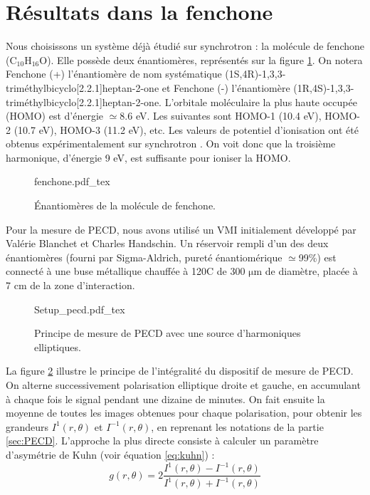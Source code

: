 \section{Résultats dans la fenchone}
\label{sec:results_fenchone}
Nous choisissons un système déjà étudié sur synchrotron : la molécule de fenchone ($\text{C}_{10}\text{H}_{16}\text{O}$). Elle possède deux énantiomères, représentés sur la figure \ref{fig:fenchone}. On notera Fenchone (+) l'énantiomère de nom systématique  (1S,4R)-1,3,3-triméthylbicyclo[2.2.1]heptan-2-one et Fenchone (-) l'énantiomère (1R,4S)-1,3,3-triméthylbicyclo[2.2.1]heptan-2-one. L'orbitale moléculaire la plus haute occupée (HOMO) est d'énergie $\simeq$8.6 eV. Les suivantes sont HOMO-1 (10.4 eV), HOMO-2 (10.7 eV), HOMO-3 (11.2 eV), etc. Les valeurs de potentiel d'ionisation ont été obtenus expérimentalement sur synchrotron . On voit donc que la troisième harmonique, d'énergie 9 eV, est suffisante pour ioniser la HOMO.

\begin{figure}[!ht]
\centering
\def\svgwidth{0.7\columnwidth}
{fenchone.pdf_tex}
\caption{\'{E}nantiomères de la molécule de fenchone.}
\label{fig:fenchone}
\end{figure}

Pour la mesure de PECD, nous avons utilisé un VMI initialement développé par Valérie Blanchet et Charles Handschin. Un réservoir rempli d'un des deux énantiomères (fourni par Sigma-Aldrich, pureté énantiomérique $\simeq$99\%) est connecté à une buse métallique chauffée à 120\degres C de 300 $\si{\micro\metre}$ de diamètre, placée à 7 cm de la zone d'interaction. 

\begin{figure}[!ht]
\centering
\def\svgwidth{0.8\columnwidth}
{Setup_pecd.pdf_tex}
\caption{Principe de mesure de PECD avec une source d'harmoniques elliptiques.}
\label{fig:pecdsetup}
\end{figure}

La figure \ref{fig:pecdsetup} illustre le principe de l'intégralité du dispositif de mesure de PECD. On alterne successivement polarisation elliptique droite et gauche, en accumulant à chaque fois le signal pendant une dizaine de minutes. On fait ensuite la moyenne de toutes les images obtenues pour chaque polarisation, pour obtenir les grandeurs $I^{1}(r,\theta)$ et $I^{-1}(r,\theta)$, en reprenant les notations de la partie \ref{sec:PECD}. L'approche la plus directe consiste à calculer un paramètre d'asymétrie de Kuhn (voir équation \ref{eq:kuhn}) :
\[g(r,\theta) = 2\frac{I^{1}(r,\theta)-I^{-1}(r,\theta)}{I^{1}(r,\theta)+I^{-1}(r,\theta)}\]

